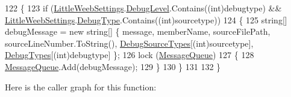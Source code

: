 \begin{DoxyCode}
122         \{
123             \textcolor{keywordflow}{if} (\mbox{\hyperlink{class_little_weeb_library_1_1_settings_1_1_little_weeb_settings}{LittleWeebSettings}}.\mbox{\hyperlink{class_little_weeb_library_1_1_settings_1_1_little_weeb_settings_a22ae8b2dc7e6bb5e0b3b0220484c4c86}{DebugLevel}}.Contains((\textcolor{keywordtype}{int})debugtype) && 
      \mbox{\hyperlink{class_little_weeb_library_1_1_settings_1_1_little_weeb_settings}{LittleWeebSettings}}.\mbox{\hyperlink{class_little_weeb_library_1_1_settings_1_1_little_weeb_settings_a3e498a95757f135bc082566afbfa8877}{DebugType}}.Contains((\textcolor{keywordtype}{int})sourcetype))
124             \{
125                 \textcolor{keywordtype}{string}[] debugMessage = \textcolor{keyword}{new} \textcolor{keywordtype}{string}[] \{ message, memberName, sourceFilePath, 
      sourceLineNumber.ToString(), \mbox{\hyperlink{class_little_weeb_library_1_1_handlers_1_1_debug_handler_a6073413df4c401fb94a64ee2a0649293}{DebugSourceTypes}}[(int)sourcetype], \mbox{\hyperlink{class_little_weeb_library_1_1_handlers_1_1_debug_handler_a99de78cea15e565e6c5c819b7230e57b}{DebugTypes}}[(\textcolor{keywordtype}{int})debugtype] \};
126                 lock (\mbox{\hyperlink{class_little_weeb_library_1_1_handlers_1_1_debug_handler_af4dc20fe66b515bdd875bb4b1124cb2a}{MessageQueue}})
127                 \{
128                     \mbox{\hyperlink{class_little_weeb_library_1_1_handlers_1_1_debug_handler_af4dc20fe66b515bdd875bb4b1124cb2a}{MessageQueue}}.Add(debugMessage);
129                 \}
130             \}
131             
132         \}
\end{DoxyCode}
Here is the caller graph for this function\+:\nopagebreak
